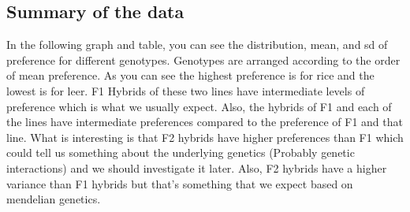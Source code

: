 \documentclass[
]{article}
\begin{document}
\hypertarget{summary-of-the-data}{%
\subsection{Summary of the data}\label{summary-of-the-data}}

In the following graph and table, you can see the distribution, mean,
and sd of preference for different genotypes. Genotypes are arranged
according to the order of mean preference. As you can see the highest
preference is for rice and the lowest is for leer. F1 Hybrids of these
two lines have intermediate levels of preference which is what we
usually expect. Also, the hybrids of F1 and each of the lines have
intermediate preferences compared to the preference of F1 and that line.
What is interesting is that F2 hybrids have higher preferences than F1
which could tell us something about the underlying genetics (Probably
genetic interactions) and we should investigate it later. Also, F2
hybrids have a higher variance than F1 hybrids but that's something that
we expect based on mendelian genetics.
\end{document}
